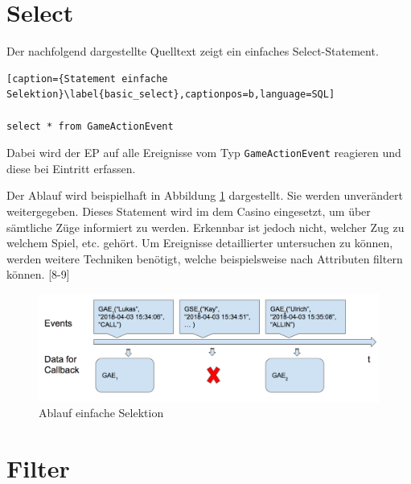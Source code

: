 \section{Select}

Der nachfolgend dargestellte Quelltext zeigt ein einfaches Select-Statement.
\begin{lstlisting}[caption={Statement einfache Selektion}\label{basic_select},captionpos=b,language=SQL]

select * from GameActionEvent

\end{lstlisting}
Dabei wird der \acf{EP} auf alle Ereignisse vom Typ \texttt{GameActionEvent} reagieren und diese bei Eintritt erfassen. 

Der Ablauf wird beispielhaft in Abbildung \ref{basic_select_img} dargestellt. Sie werden unverändert weitergegeben. Dieses Statement wird im dem Casino eingesetzt, um über sämtliche Züge informiert zu werden. Erkennbar ist jedoch nicht, welcher Zug zu welchem Spiel, etc. gehört. Um Ereignisse detaillierter untersuchen zu können, werden weitere Techniken benötigt, welche beispielsweise nach Attributen filtern können.
\cite{EsperRef2018}[8-9]

\begin{figure}[h]
	\centering
	\includegraphics[width=\textwidth,height=\textheight, keepaspectratio]{images/statement_basic_select.png}
	\caption{Ablauf einfache Selektion}
	\label{basic_select_img}
\end{figure}

\section{Filter}

